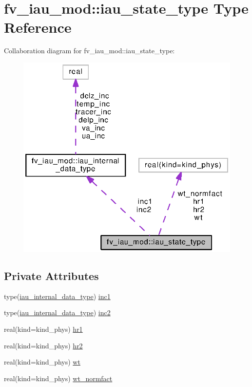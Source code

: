 \section{fv\-\_\-iau\-\_\-mod\-:\-:iau\-\_\-state\-\_\-type Type Reference}
\label{structfv__iau__mod_1_1iau__state__type}


Collaboration diagram for fv\-\_\-iau\-\_\-mod\-:\-:iau\-\_\-state\-\_\-type\-:
\nopagebreak
\begin{figure}[H]
\begin{center}
\leavevmode
\includegraphics[width=321pt]{structfv__iau__mod_1_1iau__state__type__coll__graph}
\end{center}
\end{figure}
\subsection*{Private Attributes}
\begin{DoxyCompactItemize}
\item 
type(\hyperlink{structfv__iau__mod_1_1iau__internal__data__type}{iau\-\_\-internal\-\_\-data\-\_\-type}) \hyperlink{structfv__iau__mod_1_1iau__state__type_a0af7b395dcb45a752acdf6f3ebad71fa}{inc1}
\item 
type(\hyperlink{structfv__iau__mod_1_1iau__internal__data__type}{iau\-\_\-internal\-\_\-data\-\_\-type}) \hyperlink{structfv__iau__mod_1_1iau__state__type_a2969126d74a69d2e7657439ed109ce7b}{inc2}
\item 
real(kind=kind\-\_\-phys) \hyperlink{structfv__iau__mod_1_1iau__state__type_a38fd8515897c8144e55a7e1298fba14e}{hr1}
\item 
real(kind=kind\-\_\-phys) \hyperlink{structfv__iau__mod_1_1iau__state__type_a2d22a0517262e33fe37c31d99638e512}{hr2}
\item 
real(kind=kind\-\_\-phys) \hyperlink{structfv__iau__mod_1_1iau__state__type_aae6b10a1f01da751413176dc4196e695}{wt}
\item 
real(kind=kind\-\_\-phys) \hyperlink{structfv__iau__mod_1_1iau__state__type_a04f738f0d6fbb3e64e44fc94421bf48d}{wt\-\_\-normfact}
\end{DoxyCompactItemize}


